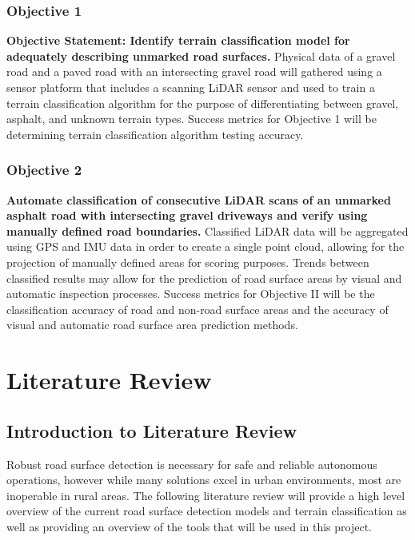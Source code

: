 \documentclass[numbered,pdftex]{ohio-etd}
\begin{document}
{	\subsection{Objective 1}
	
		{\textbf{Objective Statement: Identify terrain classification model for adequately describing unmarked road surfaces.} Physical data of a gravel road and a paved road with an intersecting gravel road will gathered using a sensor platform that includes a scanning LiDAR sensor and used to train a terrain classification algorithm for the purpose of differentiating between gravel, asphalt, and unknown terrain types. Success metrics for Objective 1 will be determining terrain classification algorithm testing accuracy.}

	\subsection{Objective 2}

		{\textbf{Automate classification of consecutive LiDAR scans of an unmarked asphalt road with intersecting gravel driveways and verify using manually defined road boundaries.} Classified LiDAR data will be aggregated using GPS and IMU data in order to create a single point cloud, allowing for the projection of manually defined areas for scoring purposes. Trends between classified results may allow for the prediction of road surface areas by visual and automatic inspection processes. Success metrics for Objective II will be the classification accuracy of road and non-road surface areas and the accuracy of visual and automatic road surface area prediction methods.}


\chapter{Literature Review}

	\section{Introduction to Literature Review}
		
		{Robust road surface detection is necessary for safe and reliable autonomous operations, however while many solutions excel in urban environments, most are inoperable in rural areas. The following literature review will provide a high level overview of the current road surface detection models and terrain classification as well as providing an overview of the tools that will be used in this project.}
		
}
\end{document}
